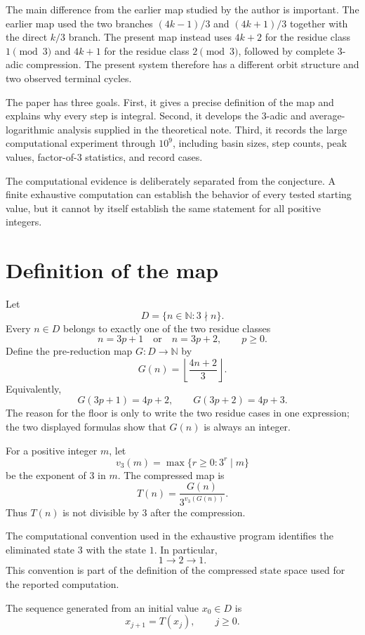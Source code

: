 \documentclass[11pt]{article}
\begin{document}
The main difference from the earlier map studied by the author is important. The earlier map used the two branches $(4k-1)/3$ and $(4k+1)/3$ together with the direct $k/3$ branch. The present map instead uses $4k+2$ for the residue class $1\pmod 3$ and $4k+1$ for the residue class $2\pmod 3$, followed by complete $3$-adic compression. The present system therefore has a different orbit structure and two observed terminal cycles.

The paper has three goals. First, it gives a precise definition of the map and explains why every step is integral. Second, it develops the $3$-adic and average-logarithmic analysis supplied in the theoretical note. Third, it records the large computational experiment through $10^9$, including basin sizes, step counts, peak values, factor-of-$3$ statistics, and record cases.

The computational evidence is deliberately separated from the conjecture. A finite exhaustive computation can establish the behavior of every tested starting value, but it cannot by itself establish the same statement for all positive integers.

\section{Definition of the map}
Let
\[
D=\{n\in\mathbb N:3\nmid n\}.
\]
Every $n\in D$ belongs to exactly one of the two residue classes
\[
n=3p+1\quad\text{or}\quad n=3p+2,
\qquad p\ge0.
\]
Define the pre-reduction map $G:D\to\mathbb N$ by
\[
G(n)=\left\lfloor\frac{4n+2}{3}\right\rfloor.
\]
Equivalently,
\[
G(3p+1)=4p+2,
\qquad
G(3p+2)=4p+3.
\]
The reason for the floor is only to write the two residue cases in one expression; the two displayed formulas show that $G(n)$ is always an integer.

For a positive integer $m$, let
\[
v_3(m)=\max\{r\ge0:3^r\mid m\}
\]
be the exponent of $3$ in $m$. The compressed map is
\[
T(n)=\frac{G(n)}{3^{v_3(G(n))}}.
\tag{1}
\]
Thus $T(n)$ is not divisible by $3$ after the compression.

The computational convention used in the exhaustive program identifies the eliminated state $3$ with the state $1$. In particular,
\[
1\longrightarrow2\longrightarrow1.
\]
This convention is part of the definition of the compressed state space used for the reported computation.

The sequence generated from an initial value $x_0\in D$ is
\[
x_{j+1}=T(x_j),\qquad j\ge0.
\]
\end{document}
